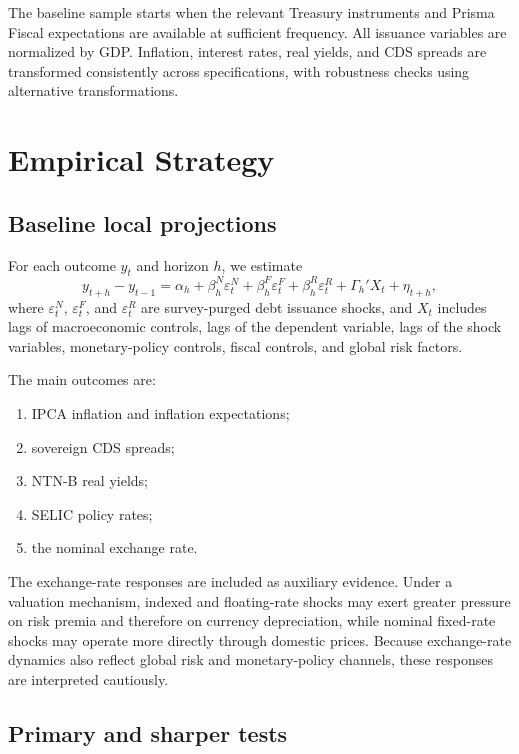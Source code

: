 \documentclass[12pt,a4paper]{article}
\begin{document}
The baseline sample starts when the relevant Treasury instruments and Prisma Fiscal expectations are available at sufficient frequency. All issuance variables are normalized by GDP. Inflation, interest rates, real yields, and CDS spreads are transformed consistently across specifications, with robustness checks using alternative transformations.

\section{Empirical Strategy}
\label{sec:empirical}

\subsection{Baseline local projections}

For each outcome \(y_t\) and horizon \(h\), we estimate
\begin{equation}
y_{t+h}-y_{t-1}
=
\alpha_h
+
\beta_h^N\varepsilon_t^N
+
\beta_h^F\varepsilon_t^F
+
\beta_h^R\varepsilon_t^R
+
\Gamma_h'X_t
+\eta_{t+h},
\label{eq:lp_baseline}
\end{equation}
where \(\varepsilon_t^N\), \(\varepsilon_t^F\), and \(\varepsilon_t^R\) are survey-purged debt issuance shocks, and \(X_t\) includes lags of macroeconomic controls, lags of the dependent variable, lags of the shock variables, monetary-policy controls, fiscal controls, and global risk factors.

The main outcomes are:
\begin{enumerate}[leftmargin=1.2cm]
    \item IPCA inflation and inflation expectations;
    \item sovereign CDS spreads;
    \item NTN-B real yields;
    \item SELIC policy rates;
    \item the nominal exchange rate.
\end{enumerate}

The exchange-rate responses are included as auxiliary evidence. Under a valuation mechanism, indexed and floating-rate shocks may exert greater pressure on risk premia and therefore on currency depreciation, while nominal fixed-rate shocks may operate more directly through domestic prices. Because exchange-rate dynamics also reflect global risk and monetary-policy channels, these responses are interpreted cautiously.

\subsection{Primary and sharper tests}
\end{document}
